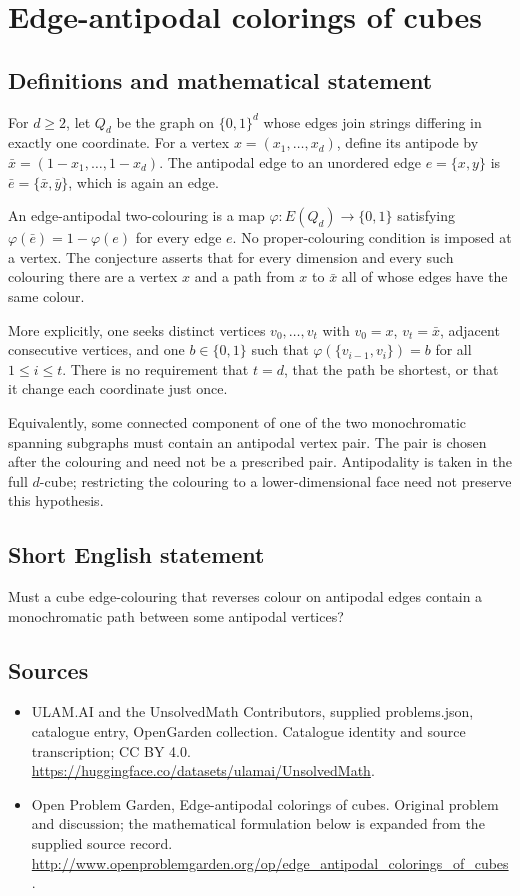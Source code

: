 \documentclass[11pt,a4paper]{article}
\begin{document}
\section*{Edge-antipodal colorings of cubes}\label{statement}

\subsection{Definitions and mathematical statement}
For $d\ge2$, let $Q_d$ be the graph on $\{0,1\}^d$ whose edges join
strings differing in exactly one coordinate. For a vertex
$x=(x_1,\ldots,x_d)$, define its antipode by
$\bar x=(1-x_1,\ldots,1-x_d)$. The antipodal edge to an unordered edge
$e=\{x,y\}$ is $\bar e=\{\bar x,\bar y\}$, which is again an edge.

An edge-antipodal two-colouring is a map
$\varphi:E(Q_d)\to\{0,1\}$ satisfying
$\varphi(\bar e)=1-\varphi(e)$ for every edge $e$.
No proper-colouring condition is imposed at a vertex.
The conjecture asserts that for every dimension and every such colouring
there are a vertex $x$ and a path from $x$ to $\bar x$ all of whose edges
have the same colour.

More explicitly, one seeks distinct vertices
$v_0,\ldots,v_t$ with $v_0=x$, $v_t=\bar x$, adjacent consecutive
vertices, and one $b\in\{0,1\}$ such that
$\varphi(\{v_{i-1},v_i\})=b$ for all $1\le i\le t$.
There is no requirement that $t=d$, that the path be shortest, or that
it change each coordinate just once.

Equivalently, some connected component of one of the two monochromatic
spanning subgraphs must contain an antipodal vertex pair. The pair is
chosen after the colouring and need not be a prescribed pair. Antipodality
is taken in the full $d$-cube; restricting the colouring to a lower-dimensional
face need not preserve this hypothesis.
\subsection{Short English statement}
Must a cube edge-colouring that reverses colour on antipodal edges contain a monochromatic path between some antipodal vertices?
\subsection{Sources}
\begin{itemize}
\item[S1] ULAM.AI and the UnsolvedMath Contributors, supplied problems.json, catalogue entry, OpenGarden collection. Catalogue identity and source transcription; CC BY 4.0.
\url{https://huggingface.co/datasets/ulamai/UnsolvedMath}.
\item[S2] Open Problem Garden, Edge-antipodal colorings of cubes. Original problem and discussion; the mathematical formulation below is expanded from the supplied source record.
\url{http://www.openproblemgarden.org/op/edge_antipodal_colorings_of_cubes}.
\end{itemize}
\end{document}
